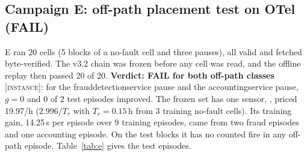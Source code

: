 \documentclass{ceurart}
\newcommand{\scope}[1]{\textsc{[#1]}}
\begin{document}
\subsection{Campaign E: off-path placement test on OTel (FAIL)}\label{sec:e}
E ran 20 cells (5 blocks of a no-fault cell and three pauses), all valid and fetched byte-verified. The
v3.2 chain was frozen before any cell was read, and the offline replay then passed 20 of 20. %
\textbf{Verdict: FAIL for both off-path classes} \scope{instance}: for the frauddetectionservice pause and the
accountingservice pause, $g = 0$ and 0 of 2 test episodes improved. %
The frozen set has one sensor, , priced 19.97/h ($2.996/T_r$ with
$T_r = 0.15$\,h from 3 training no-fault cells). Its training gain, 14.25\,s per episode over 9 training episodes, came
from two fraud episodes and one accounting episode. On the test blocks it has no counted fire in any off-path episode.
Table~\ref{tab:e} gives the test episodes.
\end{document}
